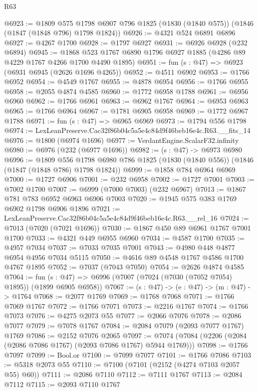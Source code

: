 \begin{lexlean}{R63}
\begin{coremodule}
@6923 := @1809
    @575
    @1798
    @6907
    @796
    @1825
    (@1830 (@1840 @575))
    (@1846 (@1847 (@1848 @796) @1798 @1824))
@6926 := @4321 @524 @6891 @6896
@6927 := @4267 @1700
@6928 := @1797 @6927
@6931 := @6926 @6928 (@232 @6894)
@6945 := @1868 @523 @1767 @6890 @1796 @6927 @1885 (@4286 @89 @4229 @1767 @4266 @1700 @4490 @1895)
@6951 := fun (s : @47) => @6923 (@6931 @6945 (@2626 @1696 @4265))
@6952 := @4511 @6902
@6953 := @1766 @6952
@6954 := @4549 @1767
@6955 := @4878 @6954
@6956 := @1766 @6955
@6958 := @2055 @4874 @4585
@6960 := @1772 @6958 @1788
@6961 := @6956 @6960
@6962 := @1766 @6961
@6963 := @6962 @1767
@6964 := @6953 @6963
@6965 := @1766 @6964
@6967 := @1781 @6905 @6958
@6969 := @1772 @6967 @1788
@6971 := fun (s : @47) => @6965 @6969
@6973 := @1794 @556 @1798
@6974 := LexLeanPreserve.Cac32f86b04c5a5e4c84d9f46beb16e4c.R63.__fits_14
@6976 := @1800 (@6974 @1696)
@6977 := VerdantEngine.ScalarF32.infinity
@6980 := @6976 (@232 (@6977 @1696))
@6982 := (s : @47) -> @6973 @6980
@6996 := @1809
    @556
    @1798
    @6980
    @786
    @1825
    (@1830 (@1840 @556))
    (@1846 (@1847 (@1848 @786) @1798 @1824))
@6999 := @1858 @784 @6964 @6969
@7000 := @1727 @6906
@7001 := @232 @6958
@7002 := @1727 @7001
@7003 := @7002 @1700
@7007 := @6999 (@7000 @7003) (@232 @6967)
@7013 := @1867 @781 @783 @6952 @6963 @6906 @7003
@7020 := @1945 @575 @383 @1769 @6902 @1798 @6906 @1896
@7021 := LexLeanPreserve.Cac32f86b04c5a5e4c84d9f46beb16e4c.R63.__rel_16
@7024 := @7013 (@7020 (@7021 @1696))
@7030 := @1867 @450 @89 @6961 @1767 @7001 @1700
@7033 := @4321 @449 @6955 @6960
@7034 := @4587 @1700
@7035 := @4957 @7034
@7037 := @7033 @7035 @7001
@7043 := @4980 @448 @4877 @6954 @4956 @7034 @5115
@7050 := @4616 @89 @4548 @1767 @4586 @1700 @4767 @1895
@7052 := @7037 (@7043 @7050)
@7054 := @2626 @4874 @4585
@7064 := fun (s : @47) => @6996 (@7007 (@7024 (@7030 (@7052 @7054) @1895)) (@1899 @6905 @6958))
@7067 := (s : @47) -> (e : @47) -> (m : @47) -> @1764
@7068 := @2077 @1769
@7069 := @1768 @7068
@7071 := @1766 @7069 @1767
@7072 := @1766 @7071
@7073 := @2216 @1767
@7074 := @1766 @7073
@7076 := @4275 @2073 @55
@7077 := @2066 @7076
@7078 := @2086 @7077
@7079 := @7078 @1767
@7084 := @2084 @7079 (@2093 @7077 @1767) @1769
@7086 := @2152 @7076 @2065
@7097 := @7074 (@7084 (@2206 (@2084 (@2086 @7086 @1767) (@2093 @7086 @1767) @5944 @1769)))
@7098 := @1766 @7097
@7099 := Bool.or
@7100 := @7099 @7077
@7101 := @1766 @7086
@7103 := @5318 @2073 @55
@7110 := @7100 (@7101 (@2152 (@4274 @7103 @2057 @55) @60))
@7111 := @2086 @7110
@7112 := @7111 @1767
@7113 := @2084 @7112
@7115 := @2093 @7110 @1767

\end{coremodule}
\end{lexlean}
